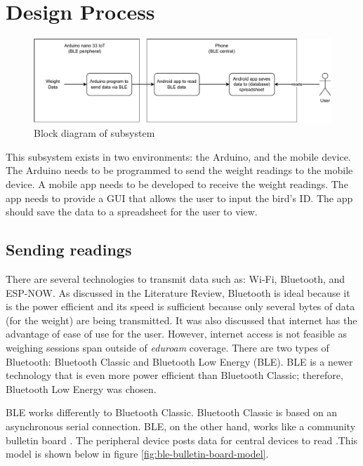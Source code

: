 \documentclass[class=report,11pt,crop=false]{standalone}
\begin{document}
			
		
	
		
	
	\section{Design Process}
		
		\begin{figure}[h!]
			\centering
			\includegraphics[width=0.9\linewidth]{Figures/Starling data block diagram.pdf}
			\caption{Block diagram of subsystem}
		\end{figure}
		
		This subsystem exists in two environments: the Arduino, and the mobile device. The Arduino needs to be programmed to send the weight readings to the mobile device. A mobile app needs to be developed to receive the weight readings. The app needs to provide a GUI that allows the user to input the bird's ID. The app should save the data to a spreadsheet for the user to view.
		
		\subsection{Sending readings}
		There are several technologies to transmit data such as: Wi-Fi, Bluetooth, and ESP-NOW. 
		As discussed in the Literature Review, Bluetooth is ideal because it is the power efficient and its speed is sufficient because only several bytes of data (for the weight) are being transmitted.
		It was also discussed that internet has the advantage of ease of use for the user. However, internet access is not feasible as weighing sessions span outside of \textit{eduroam} coverage.
		There are two types of Bluetooth: Bluetooth Classic and Bluetooth Low Energy (BLE). BLE is a newer technology that is even more power efficient than Bluetooth Classic; therefore, Bluetooth Low Energy was chosen.
		
		BLE works differently to Bluetooth Classic. Bluetooth Classic is based on an asynchronous serial connection. BLE, on the other hand, works like a community bulletin board \cite{ble}. The peripheral device posts data for central devices to read \cite{ble}.This model is shown below in figure \ref{fig:ble-bulletin-board-model}.
		
\end{document}
